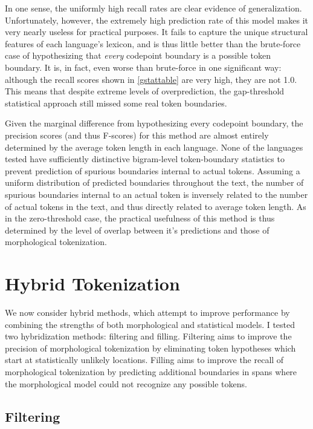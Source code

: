 In one sense, the uniformly high recall rates are clear evidence of generalization. Unfortunately, however, the extremely high prediction rate of this model makes it very nearly useless for practical purposes. It fails to capture the unique structural features of each language's lexicon, and is thus little better than the brute-force case of hypothesizing that \textit{every} codepoint boundary is a possible token boundary. It is, in fact, even worse than brute-force in one significant way: although the recall scores shown in \ref{gstattable} are very high, they are not 1.0. This means that despite extreme levels of overprediction, the gap-threshold statistical approach still missed some real token boundaries.

Given the marginal difference from hypothesizing every codepoint boundary, the precision scores (and thus F-scores) for this method are almost entirely determined by the average token length in each language. None of the languages tested have sufficiently distinctive bigram-level token-boundary statistics to prevent prediction of spurious boundaries internal to actual tokens. Assuming a uniform distribution of predicted boundaries throughout the text, the number of spurious boundaries internal to an actual token is inversely related to the number of actual tokens in the text, and thus directly related to average token length. As in the zero-threshold case, the practical usefulness of this method is thus determined by the level of overlap between it's predictions and those of morphological tokenization.

\FloatBarrier

\section{Hybrid Tokenization}

We now consider hybrid methods, which attempt to improve performance by combining the strengths of both morphological and statistical models. I tested two hybridization methods: filtering and filling. Filtering aims to improve the precision of morphological tokenization by eliminating token hypotheses which start at statistically unlikely locations. Filling aims to improve the recall of morphological tokenization by predicting additional boundaries in spans where the morphological model could not recognize any possible tokens.

\subsection{Filtering}
\FloatBarrier

